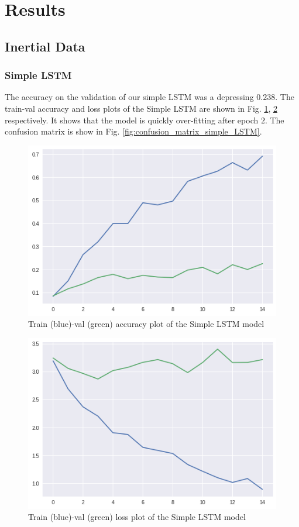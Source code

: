 \documentclass[conference]{IEEEtran}
\begin{document}
\section{Results}
\subsection{Inertial Data}
\subsubsection{Simple LSTM}
The accuracy on the validation of our simple LSTM was a depressing $0.238$. The train-val accuracy and loss plots of the Simple LSTM are shown in Fig. \ref{fig:train_val_acc_simple_LSTM}, \ref{fig:train_val_loss_simple_LSTM} respectively. It shows that the model is quickly over-fitting after epoch $2$. The confusion matrix is show in Fig. \ref{fig:confusion_matrix_simple_LSTM}. 
\begin{figure}[H]
\begin{center}
\includegraphics[scale=0.4]{simple_LSTM/simpleLSTM_acc_plot.png}
\end{center}
\caption{\label{fig:train_val_acc_simple_LSTM} 
Train (blue)-val (green) accuracy plot of the Simple LSTM model}
\end{figure}
\begin{figure}[H]
\begin{center}
\includegraphics[scale=0.4]{simple_LSTM/simpleLSTM_loss_plot.png}
\end{center}
\caption{\label{fig:train_val_loss_simple_LSTM} 
Train (blue)-val (green) loss plot of the Simple LSTM model}
\end{figure}
\end{document}
